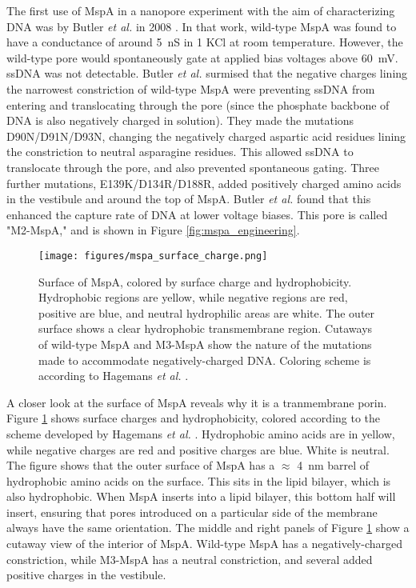 The first use of MspA in a nanopore experiment with the aim of characterizing DNA was by Butler \textit{et al.} in 2008 \citep{Butler2008}.  In that work, wild-type MspA was found to have a conductance of around \SI{5}{\nano\siemens} in \SI{1}{\Molar} KCl at room temperature.  However, the wild-type pore would spontaneously gate at applied bias voltages above \SI{60}{\mV}.  ssDNA was not detectable.  Butler \textit{et al.} surmised that the negative charges lining the narrowest constriction of wild-type MspA were preventing ssDNA from entering and translocating through the pore (since the phosphate backbone of DNA is also negatively charged in solution).  They made the mutations D90N/D91N/D93N, changing the negatively charged aspartic acid residues lining the constriction to neutral asparagine residues.  This allowed ssDNA to translocate through the pore, and also prevented spontaneous gating.  Three further mutations, E139K/D134R/D188R, added positively charged amino acids in the vestibule and around the top of MspA.  Butler \textit{et al.} found that this enhanced the capture rate of DNA at lower voltage biases.  This pore is called "M2-MspA," and is shown in Figure \ref{fig:mspa_engineering}.

\begin{figure}[h]
\begin{centering}
\texttt{[image: figures/mspa\_surface\_charge.png]}
\caption[Hydrophobicity and surface charge of MspA]{Surface of MspA, colored by surface charge and hydrophobicity.  Hydrophobic regions are yellow, while negative regions are red, positive are blue, and neutral hydrophilic areas are white.  The outer surface shows a clear hydrophobic transmembrane region.  Cutaways of wild-type MspA and M3-MspA show the nature of the mutations made to accommodate negatively-charged DNA.  Coloring scheme is according to Hagemans \textit{et al.} \citep{Hagemans2015}.}
\label{fig:mspa_engineering_charge}
\end{centering}
\end{figure}

A closer look at the surface of MspA reveals why it is a tranmembrane porin.  Figure \ref{fig:mspa_engineering_charge} shows surface charges and hydrophobicity, colored according to the scheme developed by Hagemans \textit{et al.} \citep{Hagemans2015}.  Hydrophobic amino acids are in yellow, while negative charges are red and positive charges are blue.  White is neutral.  The figure shows that the outer surface of MspA has a $\approx$ \SI{4}{\nm} barrel of hydrophobic amino acids on the surface.  This sits in the lipid bilayer, which is also hydrophobic.  When MspA inserts into a lipid bilayer, this bottom half will insert, ensuring that pores introduced on a particular side of the membrane always have the same orientation.  The middle and right panels of Figure \ref{fig:mspa_engineering_charge} show a cutaway view of the interior of MspA.  Wild-type MspA has a negatively-charged constriction, while M3-MspA has a neutral constriction, and several added positive charges in the vestibule.

